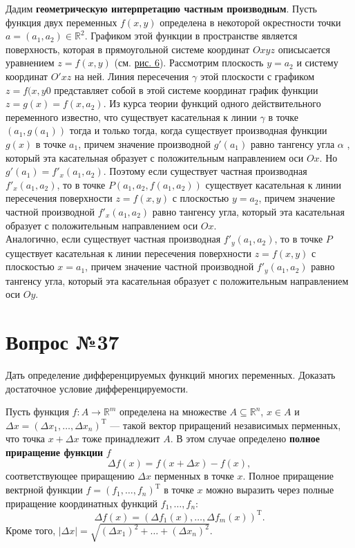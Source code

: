 \documentclass[12pt]{report}
\numberwithin{equation}{section}
\begin{document}
Дадим \textbf{геометрическую интерпретацию частным производным}. Пусть функция двух переменных $f(x,y)$ определена в некоторой окрестности точки $a = (a_1, a_2) \in \mathbb{R}^2$. Графиком этой функции в пространстве является поверхность, которая в прямоугольной системе координат $Oxyz$ описысается уравнением $z = f(x,y)$ (см. \hyperref[pic:36:1]{рис. 6}). Рассмотрим плоскость $y = a_2$ и систему координат $O'xz$ на ней. Линия пересечения $\gamma$ этой плоскости с графиком $z = f(x,y0$ представляет собой в этой системе координат график функции $z = g(x) = f(x,a_2)$. Из курса теории функций одного действительного переменного известно, что существует касательная к линии $\gamma$ в точке $(a_1, g(a_1))$ тогда и только тогда, когда существует производная функции $g(x)$ в точке $a_1$, причем значение производной $g'(a_1)$ равно тангенсу угла $\alpha$ , который эта касательная образует с положительным направлением оси $Ox$. Но $g'(a_1) = f'_x(a_1, a_2)$. Поэтому если существует частная производная $f'_x(a_1, a_2)$, то в точке $P(a_1, a_2, f(a_1, a_2))$ существует касательная к линии пересечения поверхности $z = f(x,y)$ с плоскостью $y = a_2$, причем значение частной производной $f'_x(a_1, a_2)$ равно тангенсу угла, который эта касательная образует с положительным направлением оси $Ox$.\\

Аналогично, если существует частная производная $f'_y(a_1, a_2)$, то в точке $P$ существует касательная к линии пересечения поверхности $z = f(x,y)$ с плоскостью $x = a_1$, причем значение частной производной $f'_y(a_1, a_2)$ равно тангенсу угла, который эта касательная образует с положительным направлением оси $Oy$.

\newpage \section{Вопрос №37} %
\begin{framed}
Дать определение дифференцируемых функций многих переменных. Доказать достаточное
условие дифференцируемости.
\end{framed}
Пусть функция $f : A \to \mathbb{R}^m$ определена  на множестве $A \subseteq \mathbb{R}^n$, $x \in A$ и $\Delta x = (\Delta x_1, \ldots, \Delta x_n)^{\mathrm{T}}$ --- такой вектор приращений независимых перменных, что точка $x + \Delta x$ тоже принадлежит $A$. В этом случае определено \textbf{полное приращение функции} $f$
\[ \Delta f(x) = f(x + \Delta x) - f(x),\]
соответствующее приращению $\Delta x$ перменных в точке $x$. Полное приращение вектрной функции $f = (f_1, \ldots, f_n)^{\mathrm{T}}$ в точке $x$ можно выразить через полные приращение координатных функций $f_1, \ldots, f_n$:
\begin{equation} \label{eq:37:1} \Delta f(x) = (\Delta f_1(x), \ldots, \Delta f_m(x))^{\mathrm{T}}. \end{equation}
Кроме того, $|\Delta x| = \sqrt{(\Delta x_1)^2 + \dots + (\Delta x_n)^2}$.\\
\end{document}
